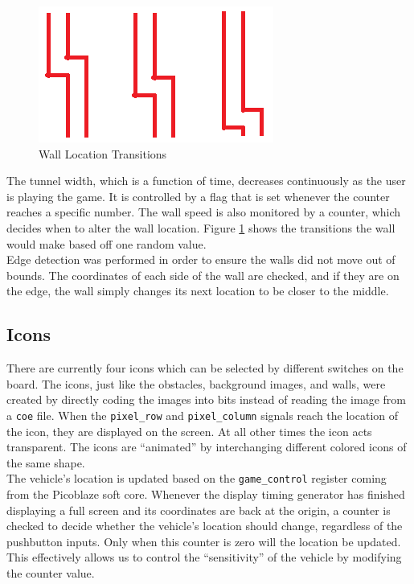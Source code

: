 \documentclass[11pt]{article}
\begin{document}
	\begin{figure}[h]\centering
	\includegraphics[height=0.3\textwidth]{Images/wall.png}
	\caption{Wall Location Transitions}
		\label{wall}
	\end{figure}

\hspace{12pt} The tunnel width, which is a function of time, decreases continuously as the user is playing the game. 
It is controlled by a flag that is set whenever the counter reaches a specific number. The wall speed is also monitored by a counter, which decides when to alter the wall location.  Figure \ref{wall} shows the transitions the wall would make based off one random value. \\

\hspace{12pt} Edge detection was performed in order to ensure the walls did not move out of bounds.  The coordinates of each side of the wall are checked, and if they are on the edge, the wall simply changes its next location to be closer to the middle.  \\
	
		\subsection{Icons}
		There are currently four icons which can be selected by different switches on the board. The icons, just like the obstacles, background images, and walls, were created by directly coding the images into bits instead of reading the image from a \texttt{coe} file. When the \texttt{pixel\_row} and \texttt{pixel\_column} signals reach the location of the icon, they are displayed on the screen. At all other times the icon acts transparent. The icons are ``animated'' by interchanging different colored icons of the same shape.  \\
\hspace{12pt} The vehicle's location is updated based on the \texttt{game\_control} register coming from the Picoblaze soft core. Whenever the display timing generator has finished displaying a full screen and its coordinates are back at the origin, a counter is checked to decide whether the vehicle's location should change, regardless of the pushbutton inputs.  Only when this counter is zero will the location be updated.  This effectively allows us to control the ``sensitivity'' of the vehicle by modifying the counter value. 
\end{document}
